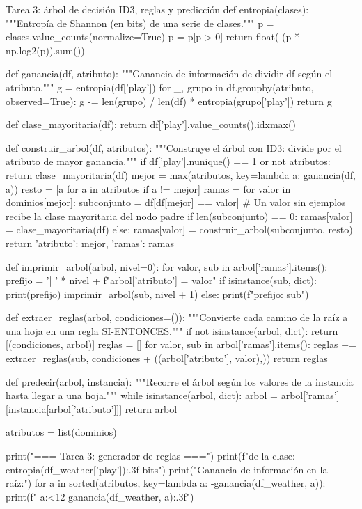 \documentclass[11pt,letterpaper]{article}
\begin{document}
\begin{codigo}[label=cod:tarea3]{Tarea 3: árbol de decisión ID3, reglas y predicción}
def entropia(clases):
    """Entropía de Shannon (en bits) de una serie de clases."""
    p = clases.value_counts(normalize=True)
    p = p[p > 0]
    return float(-(p * np.log2(p)).sum())


def ganancia(df, atributo):
    """Ganancia de información de dividir df según el atributo."""
    g = entropia(df['play'])
    for _, grupo in df.groupby(atributo, observed=True):
        g -= len(grupo) / len(df) * entropia(grupo['play'])
    return g


def clase_mayoritaria(df):
    return df['play'].value_counts().idxmax()


def construir_arbol(df, atributos):
    """Construye el árbol con ID3: divide por el atributo de mayor ganancia."""
    if df['play'].nunique() == 1 or not atributos:
        return clase_mayoritaria(df)
    mejor = max(atributos, key=lambda a: ganancia(df, a))
    resto = [a for a in atributos if a != mejor]
    ramas = {}
    for valor in dominios[mejor]:
        subconjunto = df[df[mejor] == valor]
        # Un valor sin ejemplos recibe la clase mayoritaria del nodo padre
        if len(subconjunto) == 0:
            ramas[valor] = clase_mayoritaria(df)
        else:
            ramas[valor] = construir_arbol(subconjunto, resto)
    return {'atributo': mejor, 'ramas': ramas}


def imprimir_arbol(arbol, nivel=0):
    for valor, sub in arbol['ramas'].items():
        prefijo = '|   ' * nivel + f"{arbol['atributo']} = {valor}"
        if isinstance(sub, dict):
            print(prefijo)
            imprimir_arbol(sub, nivel + 1)
        else:
            print(f"{prefijo}: {sub}")


def extraer_reglas(arbol, condiciones=()):
    """Convierte cada camino de la raíz a una hoja en una regla SI-ENTONCES."""
    if not isinstance(arbol, dict):
        return [(condiciones, arbol)]
    reglas = []
    for valor, sub in arbol['ramas'].items():
        reglas += extraer_reglas(sub, condiciones + ((arbol['atributo'], valor),))
    return reglas


def predecir(arbol, instancia):
    """Recorre el árbol según los valores de la instancia hasta llegar a una hoja."""
    while isinstance(arbol, dict):
        arbol = arbol['ramas'][instancia[arbol['atributo']]]
    return arbol


atributos = list(dominios)

print("\n=== Tarea 3: generador de reglas ===")
print(f" de la clase: {entropia(df_weather['play']):.3f} bits")
print("Ganancia de información en la raíz:")
for a in sorted(atributos, key=lambda a: -ganancia(df_weather, a)):
    print(f"  {a:<12} {ganancia(df_weather, a):.3f}")


\end{codigo}
\end{document}
